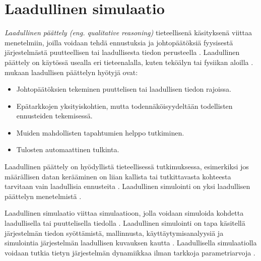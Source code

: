 \documentclass[utf8]{gradu3}
\begin{document}
\section{Laadullinen simulaatio} \label{laadullinen simulaatio}
\textit{Laadullinen päättely (eng. qualitative reasoning)} 
tieteellisenä käsityksenä viittaa menetelmiin, joilla
voidaan tehdä ennustuksia ja johtopäätöksiä fyysisestä järjestelmästä puutteellisen tai laadullisesta tiedon perusteella
\parencite{QualitativeReasoning1997}. 
Laadullinen päättely on käytössä usealla eri tieteenalalla, kuten teköälyn \parencite[luku~35]{qualitativeReasoning2014} tai fysiikan aloilla \parencite{QualitativePhysics1988}.
\textcite{QualitativeReasoning1997} mukaan laadullisen päättelyn hyötyjä ovat:
\begin{itemize}
    \item Johtopäätöksien tekeminen puuttelisen tai laadullisen tiedon rajoissa.
    \begin{comment}
        Vähän outo lause, mitä tarkoittaa? Kannattaisiko näitä joka tapauksessa avata muutamalla virkkeellä ainakin siltä osin jos eivät ole itsestään selviä. Onko avattu lähteessä? ->
    \end{comment}
    \item Epätarkkojen yksityiskohtien, mutta todennäköisyydeltään todellisten ennusteiden tekemisessä.
    \item Muiden mahdollisten tapahtumien helppo tutkiminen.
    \item Tulosten automaattinen tulkinta. 
\end{itemize}
Laadullinen päättely on hyödyllistä tieteellisessä tutkimuksessa, esimerkiksi jos 
määrällisen datan kerääminen on liian kallista tai 
tutkittavasta kohteesta tarvitaan vain laadullisia ennusteita
\parencite{QualitativeReasoning1997}.
Laadullinen simulointi on yksi laadullisen päättelyn menetelmistä \parencite{kuipers1986qualitative}. 

Laadullinen simulaatio viittaa simulaatioon, jolla voidaan simuloida kohdetta
laadullisella tai puuttelisella tiedolla \parencite{kuipers1986qualitative}.
Laadullinen simulointi on tapa käsitellä järjestelmän tiedon syöttämistä, 
mallinnusta, käyttäytymisanalyysiä ja simulointia järjestelmän 
laadullisen kuvauksen kautta \parencite{QualSimTheoryApplications2013}.
Laadullisella simulaatiolla voidaan tutkia tietyn järjestelmän dynamiikkaa 
ilman tarkkoja parametriarvoja \parencite{cosme2023history}. 
\end{document}
